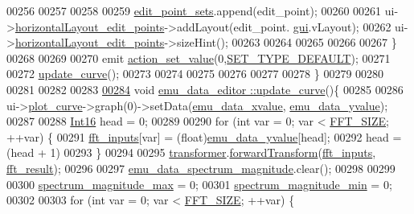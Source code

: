 \begin{DoxyCode}
00256 
00257 
00258 
00259            \hyperlink{a00008_ab093b86d07b4eb96c36878089a7d97df}{edit\_point\_sets}.append(edit\_point);
00260 
00261            ui->\hyperlink{a00079_ae08b661288ecee049945e4a63d0c0af0}{horizontalLayout\_edit\_points}->addLayout(edit\_point.
      \hyperlink{a00004_ad927f72d9047284b972a0aaa5aa94b93}{gui}.vLayout);
00262            ui->\hyperlink{a00079_ae08b661288ecee049945e4a63d0c0af0}{horizontalLayout\_edit\_points}->sizeHint();
00263 
00264 
00265 
00266 
00267           \}
00268 
00269 
00270           emit \hyperlink{a00008_a7c1fa0d7d1623b11d4badceb1854010e}{action\_set\_value}(0,\hyperlink{a00090_afd1036bf6329d2ac31913e14c1f56725}{SET\_TYPE\_DEFAULT});
00271 
00272           \hyperlink{a00008_a15cbcf5f0a17281468800f47898f60c1}{update\_curve}();
00273 
00274 
00275 
00276 
00277 
00278 \}
00279 
00280 
00281 
00282 
00283 
\hypertarget{a00093_source_l00284}{}\hyperlink{a00008_a15cbcf5f0a17281468800f47898f60c1}{00284} \textcolor{keywordtype}{void} \hyperlink{a00008_a15cbcf5f0a17281468800f47898f60c1}{emu\_data\_editor ::update\_curve}()\{
00285 
00286      ui->\hyperlink{a00079_a1d46308dee8db7e3c99af65f13055479}{plot\_curve}->graph(0)->setData(\hyperlink{a00008_a66d07ec51f26cd9b84994548faa336d6}{emu\_data\_xvalue}, 
      \hyperlink{a00008_ad922d05d1e988d84f404c115fe909f72}{emu\_data\_yvalue});
00287 
00288      \hyperlink{a00004_a3985266aecb120f269789241c170850c}{Int16} head = 0;
00289 
00290      \textcolor{keywordflow}{for} (\textcolor{keywordtype}{int} var = 0; var < \hyperlink{a00094_a636ddc19af00bc87969a07c88331f105}{FFT\_SIZE}; ++var) \{
00291          \hyperlink{a00008_a8782fc20094d65d56c04869b9692902e}{fft\_inputs}[var] = (float)\hyperlink{a00008_ad922d05d1e988d84f404c115fe909f72}{emu\_data\_yvalue}[head];
00292          head = (head + 1)%
00293      \}
00294 
00295      \hyperlink{a00008_a0d6e12337ef942452edea37827e58cd4}{transformer}.\hyperlink{a00054_a02bee79c9e9f978ed1fb012eda58ed5d}{forwardTransform}(\hyperlink{a00008_a8782fc20094d65d56c04869b9692902e}{fft\_inputs}, 
      \hyperlink{a00008_a63b6150bfbba86ba943877a2f547ddd8}{fft\_result});
00296 
00297      \hyperlink{a00008_ac3c515466f79ab8e60a58e8d15a3b991}{emu\_data\_spectrum\_magnitude}.clear();
00298 
00299 
00300      \hyperlink{a00008_ae0119c7dd2179cdcb3ea37adbefdc289}{spectrum\_magnitude\_max} = 0;
00301      \hyperlink{a00008_afb692cc49c350d4bf120ca1e3dd61e93}{spectrum\_magnitude\_min} = 0;
00302 
00303      \textcolor{keywordflow}{for} (\textcolor{keywordtype}{int} var = 0; var < \hyperlink{a00094_a636ddc19af00bc87969a07c88331f105}{FFT\_SIZE}; ++var) \{

\end{DoxyCode}
